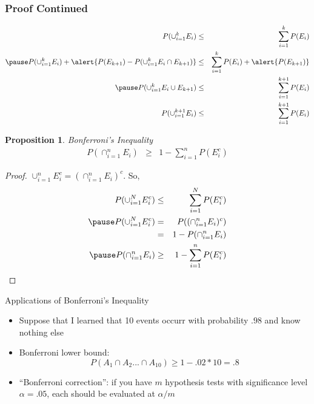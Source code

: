 \documentclass[handout]{beamer}
\newtheorem{prop}{Proposition}
\numberwithin{equation}{section}
\begin{document}
\begin{frame}
\frametitle{Proof Continued}

\begin{eqnarray}
P(\cup_{i=1}^{k} E_i ) & \leq  & \sum_{i=1}^{k} P(E_{i} ) \nonumber \\ \pause 
P(\cup_{i=1}^{k} E_i) + \alert{P(E_{k + 1} ) - P(\cup_{i=1}^{k} E_i \cap E_{k + 1})} & \leq & 
\sum_{i=1}^{k} P(E_{i} ) + \alert{P(E_{k + 1} )} \nonumber \\ \pause 
P(\cup_{i=1}^{k } E_i \cup E_{k + 1} ) & \leq & \sum_{i=1}^{k + 1} P(E_{i} )\nonumber \\
P(\cup_{i=1}^{k + 1} E_i) & \leq & \sum_{i=1}^{k + 1} P(E_{i} )\nonumber 
\end{eqnarray}



\end{frame}


\begin{frame}

\begin{prop}
Bonferroni's Inequality
\begin{eqnarray}
P(\cap_{i=1}^{n} E_{i} ) & \geq & 1 - \sum_{i=1}^{n} P(E_{i}^{c} ) \nonumber  
\end{eqnarray}

\end{prop}

\pause 
\begin{proof}
$\cup_{i=1}^{n} E_{i}^{c} = (\cap_{i=1}^{n} E_{i})^c$.  So,  \pause 
\begin{eqnarray}
P(\cup_{i=1}^{N} E_{i}^{c} ) & \leq  & \sum_{i=1}^{N} P(E_{i}^{c} ) \nonumber \\ \pause 
P(\cup_{i=1}^{N} E_{i}^{c} ) & = & P((\cap_{i=1}^{n} E_{i})^c) \nonumber \\
& = & 1 - P(\cap_{i=1}^{n} E_{i}) \nonumber \\ \pause 
P(\cap_{i=1}^{n} E_{i}) & \geq  &  1- \sum_{i=1}^{n} P(E_{i}^{c} )\nonumber 
\end{eqnarray}



\end{proof}

\end{frame}

\begin{frame}{Applications of Bonferroni's Inequality}

\begin{itemize}
\item Suppose that I learned that 10 events occurr with probability $.98$ and know nothing else
\item[] Bonferroni lower bound:
$$P(A_1\cap A_2...\cap A_{10})\geq 1-.02*10=.8$$
\item ``Bonferroni correction'': if you have $m$ hypothesis tests with significance level $\alpha=.05$, each should be evaluated at $\alpha/m$
\end{itemize}
\end{frame}
\end{document}
